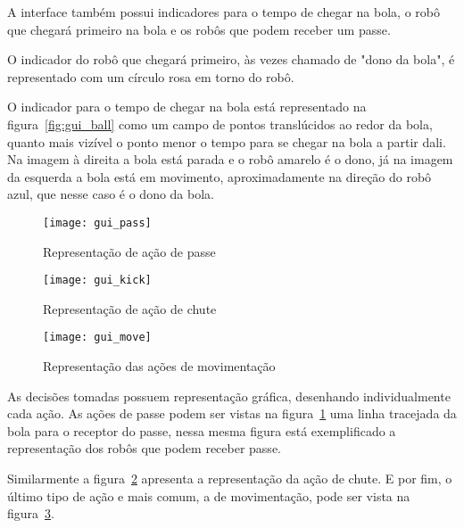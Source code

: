 A interface também possui indicadores para o tempo de chegar na bola, o robô que
chegará primeiro na bola e os robôs que podem receber um passe.

O indicador do robô que chegará primeiro, às vezes chamado de "dono da bola", é
representado com um círculo rosa em torno do robô.

O indicador para o tempo de chegar na bola está representado na
figura~\ref{fig:gui_ball} como um campo de pontos translúcidos ao redor da bola,
quanto mais vizível o ponto menor o tempo para se chegar na bola a partir dali.
Na imagem à direita a bola está parada e o robô amarelo é o dono, já na imagem
da esquerda a bola está em movimento, aproximadamente na direção do robô azul,
que nesse caso é o dono da bola.


\begin{figure}[h]
  \centering
  \texttt{[image: gui\_pass]}
  \caption{Representação de ação de passe}\label{fig:gui_pass}
\end{figure}

\begin{figure}[h]
  \centering
  \texttt{[image: gui\_kick]}
  \caption{Representação de ação de chute}\label{fig:gui_kick}
\end{figure}

\begin{figure}[h]
  \centering
  \texttt{[image: gui\_move]}
  \caption{Representação das ações de movimentação}\label{fig:gui_move}
\end{figure}

As decisões tomadas possuem representação gráfica, desenhando individualmente
cada ação.  As ações de passe podem ser vistas na figura~\ref{fig:gui_pass} uma
linha tracejada da bola para o receptor do passe, nessa mesma figura está
exemplificado a representação dos robôs que podem receber passe.

Similarmente a figura~\ref{fig:gui_kick} apresenta a representação da ação de
chute.  E por fim, o último tipo de ação e mais comum, a de movimentação, pode
ser vista na figura~\ref{fig:gui_move}.

\FloatBarrier

